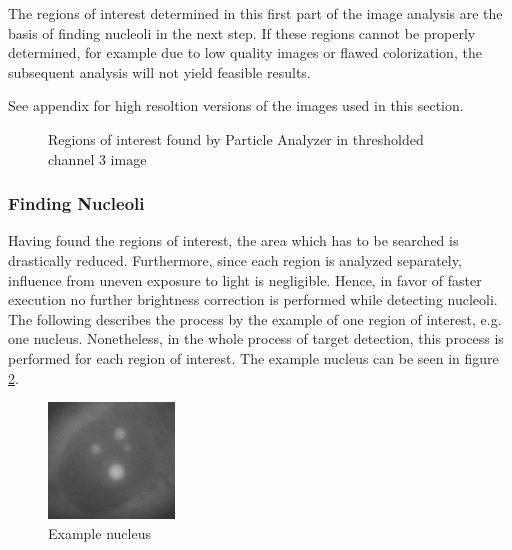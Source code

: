 \documentclass[a4paper, 11pt]{article}
\begin{document}
The regions of interest determined in this first part of the image analysis are
the basis of finding nucleoli in the next step. If these regions cannot be
properly determined, for example due to low quality images or flawed
colorization, the subsequent analysis will not yield feasible results.

See appendix for high resoltion versions of the images used in this section.

\begin{figure}[h]
\centering
{}
\caption{Regions of interest found by Particle Analyzer in thresholded channel 3
image}
\label{fig:channel3_rois}
\end{figure}

\subsubsection{Finding Nucleoli}
Having found the regions of interest, the area which has to be searched is
drastically reduced. Furthermore, since each region is analyzed separately,
influence from uneven exposure to light is negligible. Hence, in favor of
faster execution no further brightness correction is performed while detecting
nucleoli. The following describes the process by the example of one region of
interest, e.g. one nucleus. Nonetheless, in the whole process of target
detection, this process is performed for each region of interest. The example
nucleus can be seen in figure \ref{fig:example_nucleus}.

\begin{figure}
\vspace{-12pt}
\includegraphics[width=0.3\textwidth]{images/example_nucleus}
\caption{Example nucleus}
\label{fig:example_nucleus}
\vspace{-12pt}
\end{figure}
\end{document}
